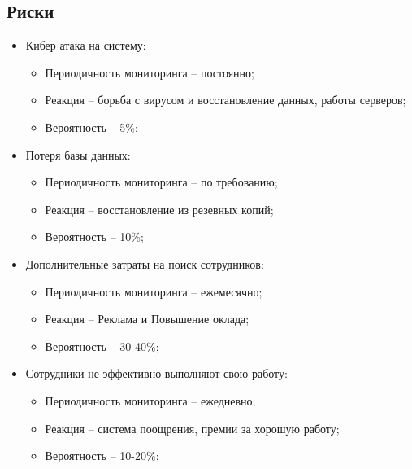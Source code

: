 \documentclass[a4paper,8pt]{article}
\begin{document}
\subsection{Риски}

    \begin{itemize}
        \item Кибер атака на систему:
            \begin{itemize}
                \item Периодичность мониторинга -- постоянно;
                \item Реакция -- борьба с вирусом и восстановление данных, работы серверов;
                \item Вероятность -- 5\%;
            \end{itemize}
        \item Потеря базы данных:
            \begin{itemize}
                \item Периодичность мониторинга -- по требованию;
                \item Реакция -- восстановление из резевных копий;
                \item Вероятность -- 10\%;
            \end{itemize}
        \item Дополнительные затраты на поиск сотрудников:
            \begin{itemize}
                \item Периодичность мониторинга -- ежемесячно;
                \item Реакция -- Реклама и Повышение оклада;
                \item Вероятность -- 30-40\%;
            \end{itemize}

        \item Сотрудники не эффективно выполняют свою работу:
            \begin{itemize}
                \item Периодичность мониторинга -- ежедневно;
                \item Реакция -- система поощрения, премии за хорошую работу;
                \item Вероятность -- 10-20\%;
            \end{itemize}

    \end{itemize}
\end{document}
